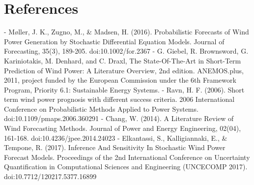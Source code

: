 \documentclass[10pt,twocolumn,letterpaper]{article}
\begin{document}
\section*{References}
\begin{flushleft}
- M\o ller, J. K., Zugno, M., \& Madsen, H. (2016). Probabilistic Forecasts of Wind Power Generation by Stochastic Differential Equation Models. Journal of Forecasting, 35(3), 189-205. doi:10.1002/for.2367 \linebreak
- G. Giebel, R. Brownsword, G. Kariniotakis, M. Denhard, and C. Draxl, The State-Of-The-Art in Short-Term Prediction of Wind Power: A Literature Overview, 2nd edition. ANEMOS.plus, 2011, project funded by the European Commission under the 6th Framework Program, Priority 6.1: Sustainable Energy Systems.\linebreak
- Ravn, H. F. (2006). Short term wind power prognosis with different success criteria. 2006 International Conference on Probabilistic Methods Applied to Power Systems. doi:10.1109/pmaps.2006.360291 \linebreak
- Chang, W. (2014). A Literature Review of Wind Forecasting Methods. Journal of Power and Energy Engineering, 02(04), 161-168. doi:10.4236/jpee.2014.24023\linebreak
- Elkantassi, S., Kalligiannaki, E., \& Tempone, R. (2017). Inference And Sensitivity In Stochastic Wind Power Forecast Models. Proceedings of the 2nd International Conference on Uncertainty Quantification in Computational Sciences and Engineering (UNCECOMP 2017). doi:10.7712/120217.5377.16899
\end{flushleft}





% 
% 
\end{document}
